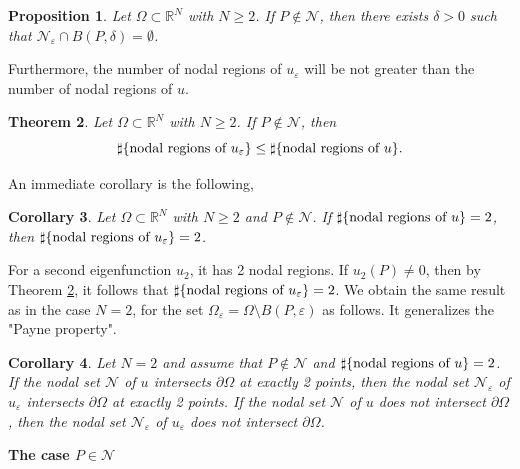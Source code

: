 \documentclass[11pt,reqno]{article}
\newtheorem{teo}{Theorem}[section]
\newtheorem{prop}[teo]{Proposition}
\newtheorem{cor}[teo]{Corollary}
\numberwithin{equation}{section}
\newcommand\R{\mathbb R}
\newcommand\e\varepsilon
\renewcommand\O\Omega
\begin{document}

	\begin{prop}\label{intr-p0}
Let $\O\subset\R^N$ with $N\ge2$. If $P\notin \mathcal{N}$, then		there exists $\delta>0$ such that  $\mathcal{N_\e}\cap B(P,\delta)=\emptyset$.
	\end{prop}
Furthermore, the number of nodal regions of $u_\e$ will be not greater than the number of nodal regions of $u$.
    \begin{teo}\label{intr-th-0804}
   Let $\O\subset\R^N$ with $N\ge2$. If $P\notin \mathcal{N}$, then 
          $$
    \sharp\{\hbox{nodal regions of } u_{\e}\}\leq \sharp \{\hbox{nodal regions of } u\}.
    $$
    \end{teo}
    An immediate corollary is the following,
   \begin{cor}
 Let $\O\subset\R^N$ with $N\ge2$ and $P\notin \mathcal{N}$. If $\sharp \{\hbox{nodal regions of } u\}=2$, then $\sharp \{\hbox{nodal regions of } u_\e\}= 2$.
   \end{cor}


    
     For a second eigenfunction $u_2$, it has 2 nodal regions. If $u_2(P)\neq 0$, then by Theorem \ref{intr-th-0804}, it follows that $\sharp \{\hbox{nodal regions of } u_\e\}=2$. We obtain  the same result as \cite[Proposition 2.6]{MukherjeeSaha2025} in the case  $N=2$, for the set $\O_\e=\O\setminus B(P,\e)$ as follows.  It   generalizes the "Payne property".
\begin{cor}
     Let $N=2$ and assume that $P\notin \mathcal{N}$ and $\sharp \{\hbox{nodal regions of } u\}=2$.  If the nodal set $\mathcal{N}$ of $u$ intersects $\partial \O$ at exactly 2 points, then the nodal set $\mathcal{N}_\e$ of $u_\e$ intersects $\partial \O$ at exactly 2 points. If the nodal set $\mathcal{N}$ of $u$ does not intersect $\partial \O$, then the nodal set $\mathcal{N}_\e$ of $u_\e$ does not intersect $\partial \O$. 
   \end{cor}
    \vskip0.2cm
   {\bf The case $P\in\mathcal{N}$}
   
\end{document}
